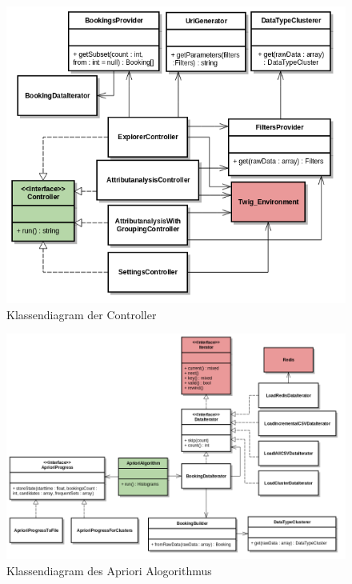 \begin{figure}[H]
	\centering
	\includegraphics[width=1\textwidth]{images/diagram-class-Controller}
	\caption{Klassendiagram der Controller}
	\label{fig:proofofconcept:klassenstruktur:1}
\end{figure}
\begin{figure}
	\centering
	\includegraphics[width=1\textwidth]{images/diagram-class-AprioriAlgorithm}
	\caption{Klassendiagram des Apriori Alogorithmus}
	\label{fig:proofofconcept:klassenstruktur:2}
\end{figure}
